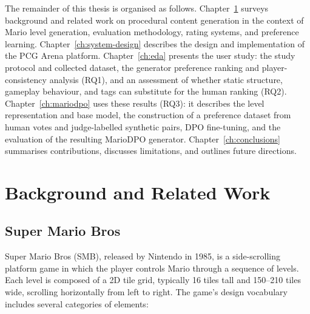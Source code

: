 \documentclass[shortabstract, mgr, english]{iithesis}
\begin{document}
The remainder of this thesis is organised as follows.
Chapter~\ref{ch:background} surveys background and related work on procedural
content generation in the context of Mario level generation, evaluation methodology,
rating systems, and preference learning. Chapter~\ref{ch:system-design} describes the design and implementation
of the PCG Arena platform. Chapter~\ref{ch:eda} presents the user
study: the study protocol and collected dataset, the generator preference
ranking and player-consistency analysis (RQ1), and an assessment of whether
static structure, gameplay behaviour, and tags can substitute for the human
ranking (RQ2). Chapter~\ref{ch:mariodpo} uses these
results (RQ3): it describes the level representation and base model, the
construction of a preference dataset from human votes and judge-labelled
synthetic pairs, DPO fine-tuning, and the evaluation of the resulting MarioDPO
generator. Chapter~\ref{ch:conclusions} summarises contributions,
discusses limitations, and outlines future directions.


\chapter{Background and Related Work}
\label{ch:background}

\section{Super Mario Bros}
\label{sec:bg-smb}

Super Mario Bros (SMB), released by Nintendo in 1985, is a side-scrolling platform
game in which the player controls Mario through a sequence of levels. Each level is
composed of a 2D tile grid, typically 16 tiles tall and 150--210 tiles wide, scrolling
horizontally from left to right. The game's design vocabulary includes several
categories of elements:
\end{document}
